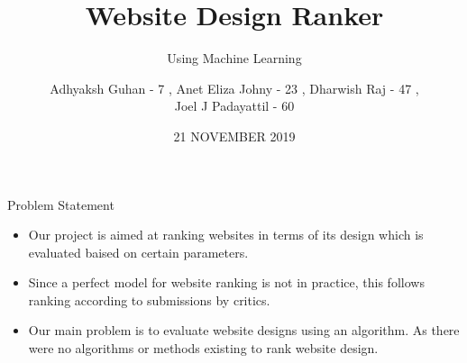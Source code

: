 \documentclass[11pt]{beamer}
\begin{document}
	\title{\textbf{Website Design Ranker}}
	\subtitle{Using Machine Learning}
	\date{21 NOVEMBER 2019}
	\author{{\scriptsize Adhyaksh Guhan - 7 , Anet Eliza Johny - 23 , Dharwish Raj - 47 , \\ Joel J Padayattil - 60}}
	\begin{frame}[plain]
		\maketitle
	\end{frame}
	\begin{frame}{Problem Statement}
		\begin{itemize}
			
			
			\item Our project is aimed at ranking websites in terms of its design which is evaluated baised on certain parameters.
			
			\item Since a perfect model for website ranking is not in practice, this follows ranking according to submissions by critics.
			
			\item Our main problem is to evaluate website designs using an algorithm. As there were no algorithms or methods existing to rank website design.
			
	
			
		\end{itemize}
	\end{frame}
\end{document}
